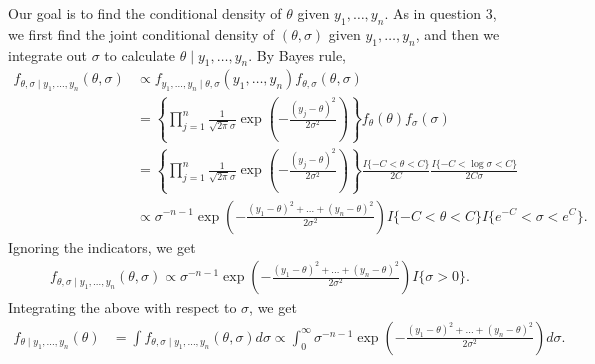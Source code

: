 \documentclass{scrartcl}
\begin{document}
Our goal is to find the conditional density of $\theta$ given $y_1,
\dots, y_n$. As in question 3, we first find the joint conditional
density of $(\theta, \sigma)$ given $y_1, \dots, y_n$, and then we
integrate out $\sigma$ to calculate $\theta \mid y_1, \dots, y_n$. By
Bayes rule,
\begin{align*}
  f_{\theta, \sigma \mid y_1, \dots, y_n}(\theta, \sigma) &\propto
                                                         f_{y_1,
                                                            \dots, y_n
                                                         \mid \theta,
                                                         \sigma}(y_1,
                                                            \dots,  y_n)
                                                         f_{\theta,
                                                         \sigma}(\theta,
                                                         \sigma) \\
  &= \left\{\prod_{j=1}^n
  \frac{1}{\sqrt{2\pi}\sigma}
  \exp\left(-\frac{(y_j-\theta)^2}{2\sigma^2}\right)\right\} f_{\theta}(\theta)
    f_{\sigma}(\sigma) \\
  &= \left\{\prod_{j=1}^n
  \frac{1}{\sqrt{2\pi}\sigma}
  \exp\left(-\frac{(y_j-\theta)^2}{2\sigma^2}\right)\right\} \frac{I\{-C <
    \theta < C\}}{2 C} \frac{I\{-C < \log \sigma < C\}}{2 C \sigma} \\
  &\propto \sigma^{-n-1} \exp \left(-\frac{(y_1 - \theta)^2 + \dots +
    (y_n - \theta)^2}{2 
    \sigma^2} \right) I\{-C < \theta < C\} I\{e^{-C} < \sigma <
    e^C\}. 
\end{align*}
Ignoring the indicators, we get 
\begin{align*}
  f_{\theta, \sigma \mid y_1, \dots, y_n}(\theta, \sigma) \propto
  \sigma^{-n-1} \exp \left(-\frac{(y_1 - \theta)^2 + \dots + (y_n -
  \theta)^2}{2  \sigma^2} \right) I\{\sigma > 0\}. 
\end{align*}
Integrating the above with respect to $\sigma$, we get 
\begin{align*}
  f_{\theta \mid y_1, \dots, y_n}(\theta) &= \int f_{\theta, \sigma \mid
                                            y_1, \dots, y_n}(\theta, \sigma) 
                           d\sigma \propto \int_0^{\infty}
                                            \sigma^{-n-1} \exp
                                            \left(-\frac{(y_1 - \theta)^2 +
                                            \dots +
                                            (y_n - \theta)^2}{2 
                           \sigma^2} \right) d \sigma.
\end{align*}
\end{document}
